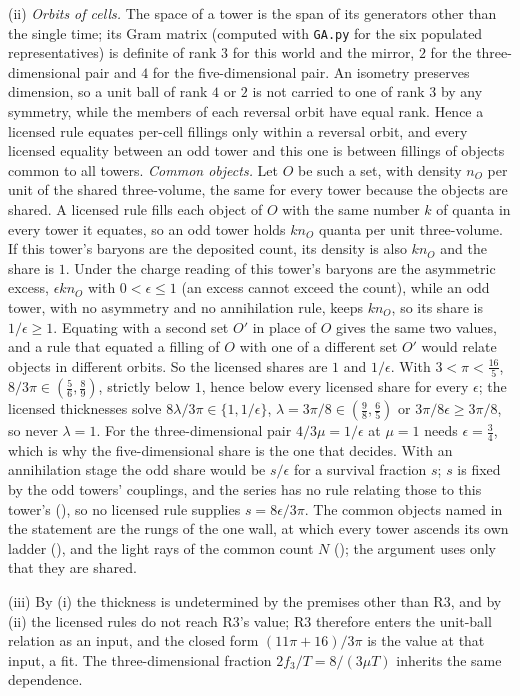 (ii) \emph{Orbits of cells.} The space of a tower is the span of its generators other than the single time; its Gram matrix (computed with \texttt{GA.py} for the six populated representatives) is definite of rank $3$ for this world and the mirror, $2$ for the three-dimensional pair and $4$ for the five-dimensional pair. An isometry preserves dimension, so a unit ball of rank $4$ or $2$ is not carried to one of rank $3$ by any symmetry, while the members of each reversal orbit have equal rank. Hence a licensed rule equates per-cell fillings only within a reversal orbit, and every licensed equality between an odd tower and this one is between fillings of objects common to all towers. \emph{Common objects.} Let $O$ be such a set, with density $n_{O}$ per unit of the shared three-volume, the same for every tower because the objects are shared. A licensed rule fills each object of $O$ with the same number $k$ of quanta in every tower it equates, so an odd tower holds $kn_{O}$ quanta per unit three-volume. If this tower's baryons are the deposited count, its density is also $kn_{O}$ and the share is $1$. Under the charge reading of  this tower's baryons are the asymmetric excess, $\epsilon kn_{O}$ with $0 < \epsilon \le 1$ (an excess cannot exceed the count), while an odd tower, with no asymmetry and no annihilation rule, keeps $kn_{O}$, so its share is $1/\epsilon \ge 1$. Equating with a second set $O'$ in place of $O$ gives the same two values, and a rule that equated a filling of $O$ with one of a different set $O'$ would relate objects in different orbits. So the licensed shares are $1$ and $1/\epsilon$. With $3 < \pi < \tfrac{16}{5}$, $8/3\pi \in (\tfrac56, \tfrac89)$, strictly below $1$, hence below every licensed share for every $\epsilon$; the licensed thicknesses solve $8\lambda/3\pi \in \{1, 1/\epsilon\}$, $\lambda = 3\pi/8 \in (\tfrac98, \tfrac65)$ or $3\pi/8\epsilon \ge 3\pi/8$, so never $\lambda = 1$. For the three-dimensional pair $4/3\mu = 1/\epsilon$ at $\mu = 1$ needs $\epsilon = \tfrac34$, which is why the five-dimensional share is the one that decides. With an annihilation stage the odd share would be $s/\epsilon$ for a survival fraction $s$; $s$ is fixed by the odd towers' couplings, and the series has no rule relating those to this tower's (), so no licensed rule supplies $s = 8\epsilon/3\pi$. The common objects named in the statement are the rungs of the one wall, at which every tower ascends its own ladder (), and the light rays of the common count $N$ (); the argument uses only that they are shared.

(iii) By (i) the thickness is undetermined by the premises other than R3, and by (ii) the licensed rules do not reach R3's value; R3 therefore enters the unit-ball relation as an input, and the closed form $(11\pi + 16)/3\pi$ is the value at that input, a fit. The three-dimensional fraction $2f_{3}/T = 8/(3\mu T)$ inherits the same dependence.
